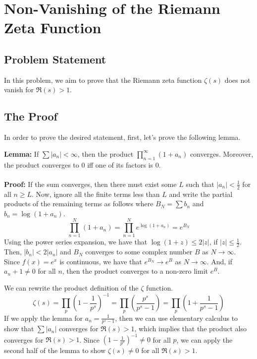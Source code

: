 \section{Non-Vanishing of the Riemann Zeta Function}
\subsection{Problem Statement}
In this problem, we aim to prove that the Riemann zeta function $\zeta(s)$ does not vanish for $\Re(s) > 1$. 
\subsection{The Proof}
In order to prove the desired statement, first, let's prove the following lemma.
\begin{boxedsection}
\textbf{Lemma:} If $\sum |a_n| < \infty$, then the product $\prod_{n=1}^\infty \left(1 + a_n\right)$ converges. Moreover, the product converges to $0$ iff one of its factors is $0$.\\
\\
\textbf{Proof:} If the sum converges, then there must exist some $L$ such that $|a_n| < \frac{1}{2}$ for all $n \geq L$. Now, ignore all the finite terms less than $L$ and write the partial products of the remaining terms as follows where $B_N = \sum b_n$ and $b_n = \log(1 + a_n)$.
$$
\prod_{n=1}^N (1+a_n) = \prod_{n=1}^N e^{\log(1+a_n)} = e^{B_N}
$$
Using the power series expansion, we have that $\log(1 + z) \leq 2|z|$, if $|z| \leq \frac{1}{2}$. Then, $|b_n| < 2 |a_n|$ and $B_N$ converges to some complex number $B$ as $N \rightarrow \infty$. Since $f(x) = e^x$ is continuous, we have that $e^{B_N} \rightarrow e^B$ as $N \rightarrow \infty$. And, if $a_n + 1 \neq 0$ for all $n$, then the product converges to a non-zero limit $e^B$. 
\end{boxedsection}
We can rewrite the product definition of the $\zeta$ function.
$$
\zeta(s) = \prod_p \left(1-\frac{1}{p^s}\right)^{-1} = \prod_p \left(\frac{p^s}{p^s-1}\right) = \prod_p \left(1 + \frac{1}{p^s-1}\right)
$$
If we apply the lemma for $a_n = \frac{1}{p^s - 1}$, then we can use elementary calculus to show that $\sum |a_n|$ converges for $\Re(s) > 1$, which implies that the product also converges for $\Re(s) > 1$. Since $\left(1-\frac{1}{p^s}\right)^{-1} \neq 0$ for all $p$, we can apply the second half of the lemma to show $\zeta(s) \neq 0$ for all $\Re(s) > 1$.